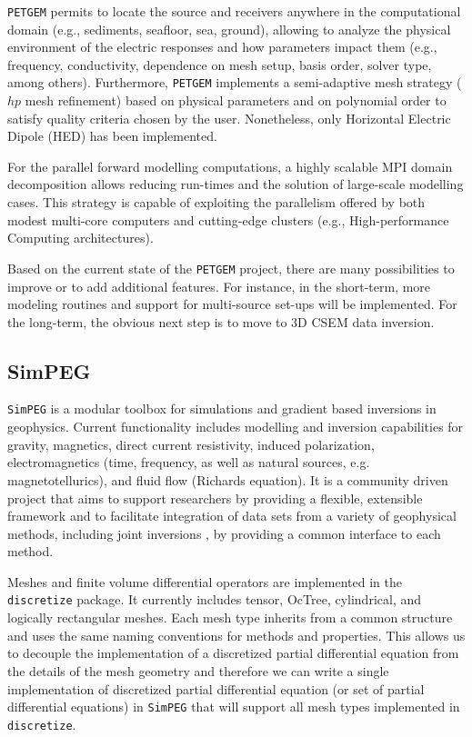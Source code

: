 \documentclass[
    paper,
  ]{geophysics}
\newcommand{\simpeg}{\texttt{SimPEG}\xspace}
\newcommand{\petgem}{\texttt{PETGEM}\xspace}
\newcommand{\mycom}[2][]{
  \todo[color=yellow]{\textbf{\uppercase{[#1]}}:~#2}}
\begin{document}
\petgem permits to locate the source and receivers anywhere in the
computational domain\mycom[DW]{I think this applies to all four codes} (e.g.,
sediments, seafloor, sea, ground), allowing to analyze the physical environment
of the electric responses and how parameters impact them (e.g., frequency,
conductivity, dependence on mesh setup, basis order, solver type, among
others). Furthermore, \petgem implements a semi-adaptive mesh strategy ($hp$
mesh refinement) based on physical parameters and on polynomial order to
satisfy quality criteria chosen by the user. Nonetheless, only Horizontal
Electric Dipole (HED) has been implemented.

For the parallel forward modelling computations, a highly scalable MPI domain
decomposition allows reducing run-times and the solution of large-scale
modelling cases. This strategy is capable of exploiting the parallelism offered
by both modest multi-core computers and cutting-edge clusters (e.g.,
High-performance Computing architectures).

Based on the current state of the \petgem project, there are many possibilities
to improve or to add additional features. For instance, in the short-term, more
modeling routines and support for multi-source set-ups will be implemented. For
the long-term, the obvious next step is to move to 3D CSEM data inversion.

\subsection{SimPEG}

\simpeg is a modular toolbox for simulations and gradient based inversions in
geophysics. Current functionality includes modelling and inversion
capabilities for gravity, magnetics, direct current resistivity, induced
polarization, electromagnetics (time, frequency, as well as natural sources,
e.g. magnetotellurics), and fluid flow (Richards equation). It is a community
driven project that aims to support researchers by providing a flexible,
extensible framework and to facilitate integration of data sets from a variety
of geophysical methods, including joint inversions \citep{Astic2020}, by
providing a common interface to each method.

Meshes and finite volume differential operators are implemented in the
\texttt{discretize} package. It currently includes tensor, OcTree,
cylindrical, and logically rectangular meshes. Each mesh type inherits from a
common structure and uses the same naming conventions for methods and
properties. This allows us to decouple the implementation of a discretized
partial differential equation from the details of the mesh geometry and
therefore we can write a single implementation of discretized partial
differential equation (or set of partial differential equations) in \simpeg
that will support all mesh types implemented in \texttt{discretize}.
\end{document}
